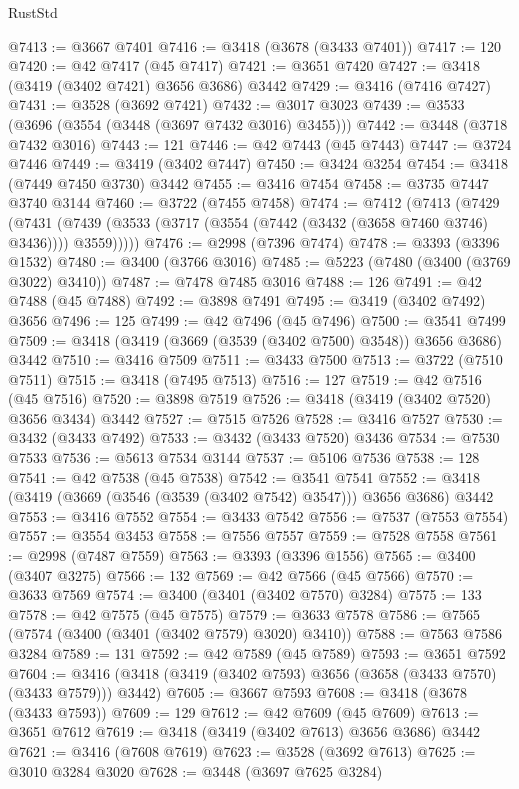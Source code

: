 \begin{lexlean}{RustStd}
\begin{coremodule}
@7413 := @3667 @7401
@7416 := @3418 (@3678 (@3433 @7401))
@7417 := 120
@7420 := @42 @7417 (@45 @7417)
@7421 := @3651 @7420
@7427 := @3418 (@3419 (@3402 @7421) @3656 @3686) @3442
@7429 := @3416 (@7416 @7427)
@7431 := @3528 (@3692 @7421)
@7432 := @3017 @3023
@7439 := @3533 (@3696 (@3554 (@3448 (@3697 @7432 @3016) @3455)))
@7442 := @3448 (@3718 @7432 @3016)
@7443 := 121
@7446 := @42 @7443 (@45 @7443)
@7447 := @3724 @7446
@7449 := @3419 (@3402 @7447)
@7450 := @3424 @3254
@7454 := @3418 (@7449 @7450 @3730) @3442
@7455 := @3416 @7454
@7458 := @3735 @7447 @3740 @3144
@7460 := @3722 (@7455 @7458)
@7474 := @7412
    (@7413
      (@7429
        (@7431 (@7439 (@3533 (@3717 (@3554 (@7442 (@3432 (@3658 @7460 @3746) @3436)))) @3559)))))
@7476 := @2998 (@7396 @7474)
@7478 := @3393 (@3396 @1532)
@7480 := @3400 (@3766 @3016)
@7485 := @5223 (@7480 (@3400 (@3769 @3022) @3410))
@7487 := @7478 @7485 @3016
@7488 := 126
@7491 := @42 @7488 (@45 @7488)
@7492 := @3898 @7491
@7495 := @3419 (@3402 @7492) @3656
@7496 := 125
@7499 := @42 @7496 (@45 @7496)
@7500 := @3541 @7499
@7509 := @3418 (@3419 (@3669 (@3539 (@3402 @7500) @3548)) @3656 @3686) @3442
@7510 := @3416 @7509
@7511 := @3433 @7500
@7513 := @3722 (@7510 @7511)
@7515 := @3418 (@7495 @7513)
@7516 := 127
@7519 := @42 @7516 (@45 @7516)
@7520 := @3898 @7519
@7526 := @3418 (@3419 (@3402 @7520) @3656 @3434) @3442
@7527 := @7515 @7526
@7528 := @3416 @7527
@7530 := @3432 (@3433 @7492)
@7533 := @3432 (@3433 @7520) @3436
@7534 := @7530 @7533
@7536 := @5613 @7534 @3144
@7537 := @5106 @7536
@7538 := 128
@7541 := @42 @7538 (@45 @7538)
@7542 := @3541 @7541
@7552 := @3418 (@3419 (@3669 (@3546 (@3539 (@3402 @7542) @3547))) @3656 @3686) @3442
@7553 := @3416 @7552
@7554 := @3433 @7542
@7556 := @7537 (@7553 @7554)
@7557 := @3554 @3453
@7558 := @7556 @7557
@7559 := @7528 @7558
@7561 := @2998 (@7487 @7559)
@7563 := @3393 (@3396 @1556)
@7565 := @3400 (@3407 @3275)
@7566 := 132
@7569 := @42 @7566 (@45 @7566)
@7570 := @3633 @7569
@7574 := @3400 (@3401 (@3402 @7570) @3284)
@7575 := 133
@7578 := @42 @7575 (@45 @7575)
@7579 := @3633 @7578
@7586 := @7565 (@7574 (@3400 (@3401 (@3402 @7579) @3020) @3410))
@7588 := @7563 @7586 @3284
@7589 := 131
@7592 := @42 @7589 (@45 @7589)
@7593 := @3651 @7592
@7604 := @3416 (@3418 (@3419 (@3402 @7593) @3656 (@3658 (@3433 @7570) (@3433 @7579))) @3442)
@7605 := @3667 @7593
@7608 := @3418 (@3678 (@3433 @7593))
@7609 := 129
@7612 := @42 @7609 (@45 @7609)
@7613 := @3651 @7612
@7619 := @3418 (@3419 (@3402 @7613) @3656 @3686) @3442
@7621 := @3416 (@7608 @7619)
@7623 := @3528 (@3692 @7613)
@7625 := @3010 @3284 @3020
@7628 := @3448 (@3697 @7625 @3284)

\end{coremodule}
\end{lexlean}

